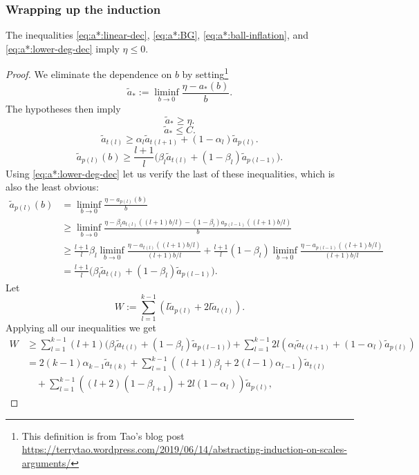 \subsubsection{Wrapping up the induction}
\begin{proposition}
The inequalities \eqref{eq:a*:linear-dec}, \eqref{eq:a*:BG}, \eqref{eq:a*:ball-inflation}, and \eqref{eq:a*:lower-deg-dec} imply $\eta \leq 0$.
\end{proposition}
\begin{proof}
We eliminate the dependence on $b$ by setting\footnote{This definition is from Tao's blog post\\\url{https://terrytao.wordpress.com/2019/06/14/abstracting-induction-on-scales-arguments/}}
\[
\tilde{a}_{*} := \liminf_{b \to 0} \frac{\eta - a_{*}(b)}{b}.
\]
The hypotheses then imply
\[
\tilde{a}_{*} \geq \eta.
\]
\[
\tilde{a}_{*} \leq C.
\]
\[
\tilde{a}_{t(l)} \geq \alpha_{l} \tilde{a}_{t(l+1)} + (1-\alpha_{l}) \tilde{a}_{p(l)}.
\]
\[
\tilde{a}_{p(l)}(b) \geq \frac{l+1}{l} \bigl( \beta_{l} \tilde{a}_{t(l)} + (1-\beta_{l}) \tilde{a}_{p(l-1)} \bigr).
\]
Using \eqref{eq:a*:lower-deg-dec} let us verify the last of these inequalities, which is also the least obvious:
\begin{align*}
\tilde{a}_{p(l)}(b)
&=
\liminf_{b\to 0} \frac{\eta - a_{p(l)}(b)}{b}
\\ &\geq
\liminf_{b\to 0} \frac{\eta - \beta_{l} a_{t(l)}((l+1)b/l) - (1-\beta_{l})a_{p(l-1)}((l+1)b/l)}{b}
\\ &\geq
\frac{l+1}{l} \beta_{l} \liminf_{b\to 0} \frac{\eta - a_{t(l)}((l+1)b/l)}{(l+1)b/l}
+
\frac{l+1}{l} (1-\beta_{l}) \liminf_{b\to 0} \frac{\eta - a_{p(l-1)}((l+1)b/l)}{(l+1)b/l}
\\ &=
\frac{l+1}{l} \bigl( \beta_{l} \tilde{a}_{t(l)} + (1-\beta_{l}) \tilde{a}_{p(l-1)} \bigr).
\end{align*}
Let
\[
W := \sum_{l=1}^{k-1} ( l \tilde{a}_{p(l)} + 2 l \tilde{a}_{t(l)} ).
\]
Applying all our inequalities we get
\begin{align*}
W & \geq
\sum_{l=1}^{k-1} (l+1) \bigl( \beta_{l} \tilde{a}_{t(l)} + (1-\beta_{l}) \tilde{a}_{p(l-1)} \bigr)
+
\sum_{l=1}^{k-1} 2 l (\alpha_{l} \tilde{a}_{t(l+1)} + (1-\alpha_{l}) \tilde{a}_{p(l)})
\\ &=
2(k-1)\alpha_{k-1} \tilde{a}_{t(k)}
+ \sum_{l=1}^{k-1} ( (l+1) \beta_{l} + 2 (l-1) \alpha_{l-1} ) \tilde{a}_{t(l)}
\\ & \quad + \sum_{l=1}^{k-1} ( (l+2)(1-\beta_{l+1}) + 2l (1-\alpha_{l})) \tilde{a}_{p(l)},
\end{align*}

\end{proof}
